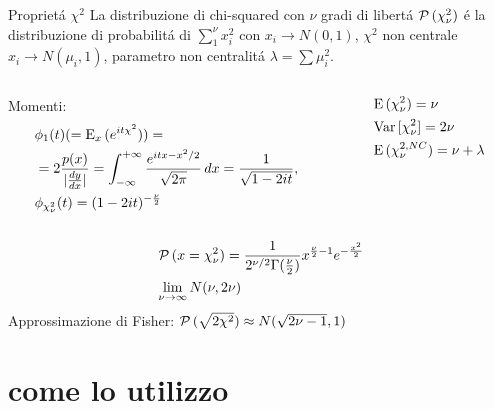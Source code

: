 \begin{frame}{Propriet\'a $\chi^2$}
La distribuzione di chi-squared con $\nu$ gradi di libert\'a $\prob{(\chi_{\nu}^2)}$ \'e la distribuzione di probabilit\'a di $\sum_1^{\nu}x_i^2$ con $x_i\to N(0,1)$, $\chi^2$ non centrale $x_i\to N(\mu_i,1)$, parametro non centralit\'a $\lambda=\sum\mu_i^2$.
\begin{columns}[T]
	\begin{column}{0.7\textwidth}
		Momenti:
		\begin{align*}
		&\phi_1(t)(=\E_x{(\exp{it\chi^2})})=\\
		&=2\frac{p(x)}{|\TDy{x}{y}|}=\intsinf{}\frac{\exp{itx-x^2/2}}{\sqrt{2\pi}}\,dx=\frac{1}{\sqrt{1-2it}},\\
		&\phi_{\chi^2_{\nu}}(t)=(1-2it)\expy{-\frac{\nu}{2}}
		\end{align*}
	\end{column}
	\begin{column}{0.3\textwidth}
		\begin{align*}
		&\E{(\chi^2_{\nu})}=\nu\\
		&\var{[\chi_{\nu}^2]}=2\nu\\
		&\E{(\chi^{2,NC}_{\nu})}=\nu+\lambda
		\end{align*}
	\end{column}
\end{columns}
\begin{align*}
&\prob{(x=\chi^2_{\nu})}=\frac{1}{2\expy{\nu/2}\Gamma(\frac{\nu}{2})}x\expy{\frac{\nu}{2}-1}\exp{-\frac{x^2}{2}}\\
&\lim_{\nu\to\infty}N(\nu,2\nu)
\end{align*}
Approssimazione di Fisher: $\prob{(\sqrt{2\chi^2})}\approx N(\sqrt{2\nu-1},1)$
\end{frame}

\section{come lo utilizzo}

